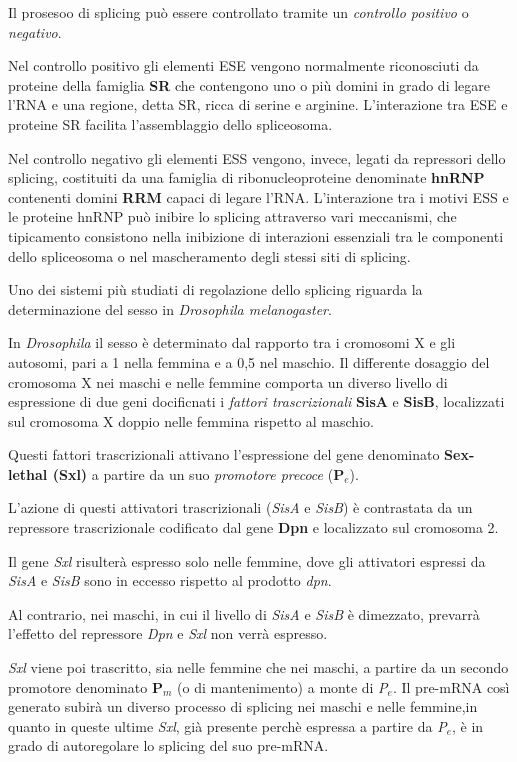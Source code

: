 \documentclass[11pt]{book}
\begin{document}
Il prosesoo di splicing può essere controllato tramite un
\emph{controllo positivo} o \emph{negativo}.

Nel controllo positivo gli elementi ESE vengono normalmente riconosciuti
da proteine della famiglia \textbf{SR} che contengono uno o più domini
in grado di legare l'RNA e una regione, detta SR, ricca di serine e
arginine. L'interazione tra ESE e proteine SR facilita l'assemblaggio
dello spliceosoma.

Nel controllo negativo gli elementi ESS vengono, invece, legati da
repressori dello splicing, costituiti da una famiglia di
ribonucleoproteine denominate \textbf{hnRNP} contenenti domini
\textbf{RRM} capaci di legare l'RNA. L'interazione tra i motivi ESS e le
proteine hnRNP può inibire lo splicing attraverso vari meccanismi, che
tipicamento consistono nella inibizione di interazioni essenziali tra le
componenti dello spliceosoma o nel mascheramento degli stessi siti di
splicing.

Uno dei sistemi più studiati di regolazione dello splicing riguarda la
determinazione del sesso in \emph{Drosophila melanogaster}.

In \emph{Drosophila} il sesso è determinato dal rapporto tra i cromosomi
X e gli autosomi, pari a 1 nella femmina e a 0,5 nel maschio. Il
differente dosaggio del cromosoma X nei maschi e nelle femmine comporta
un diverso livello di espressione di due geni docificnati i
\emph{fattori trascrizionali} \textbf{SisA} e \textbf{SisB}, localizzati
sul cromosoma X doppio nelle femmina rispetto al maschio.

Questi fattori trascrizionali attivano l'espressione del gene denominato
\textbf{Sex-lethal (Sxl)} a partire da un suo \emph{promotore precoce}
(\textbf{P\(_e\)}).

L'azione di questi attivatori trascrizionali (\emph{SisA} e \emph{SisB})
è contrastata da un repressore trascrizionale codificato dal gene
\textbf{Dpn} e localizzato sul cromosoma 2.

Il gene \emph{Sxl} risulterà espresso solo nelle femmine, dove gli
attivatori espressi da \emph{SisA} e \emph{SisB} sono in eccesso
rispetto al prodotto \emph{dpn}.

Al contrario, nei maschi, in cui il livello di \emph{SisA} e \emph{SisB}
è dimezzato, prevarrà l'effetto del repressore \emph{Dpn} e \emph{Sxl}
non verrà espresso.

\emph{Sxl} viene poi trascritto, sia nelle femmine che nei maschi, a
partire da un secondo promotore denominato \textbf{P\(_m\)} (o di
mantenimento) a monte di \emph{P\(_e\)}. Il pre-mRNA così generato
subirà un diverso processo di splicing nei maschi e nelle femmine,in
quanto in queste ultime \emph{Sxl}, già presente perchè espressa a
partire da \emph{P\(_e\)}, è in grado di autoregolare lo splicing del
suo pre-mRNA.
\end{document}
